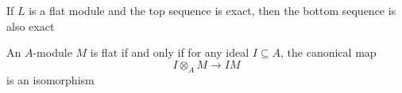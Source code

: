 \begin{remark}
	If $L$ is a flat module and the top sequence is exact, then the bottom sequence is also exact
	\begin{center}
	\end{center}
	
	An $A$-module $M$ is flat if and only if for any ideal $I \subseteq A$, the canonical map
	$$
		I \otimes_A M \to IM
	$$
	is an isomorphism
\end{remark}